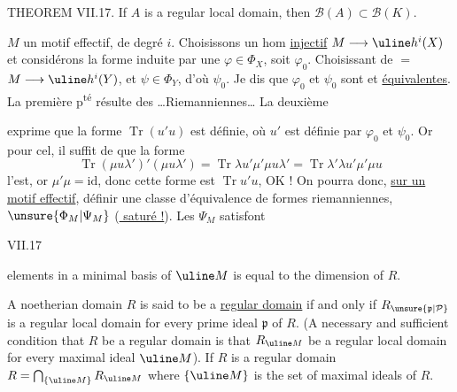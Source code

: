 THEOREM VII.17. If $A$ is a regular local domain, then
$\mathcal B(A)\subset\mathcal B(K)$.

 
$M$ un motif effectif,  de degré $i$.
Choisissons un hom \uline{injectif} $M\longrightarrow\uline h^i(X)$
et considérons la forme induite par une $\varphi\in\Phi_X$, soit $\varphi_0$.
Choisissant de $=$ $M\longrightarrow\uline h^i(Y)$, et $\psi\in\Phi_Y$,
d'où $\psi_0$. Je dis que $\varphi_0$ et $\psi_0$ sont
 et \uline{équivalentes}.
La première p\textsuperscript{té} résulte des
 
 \ldots Riemanniennes\ldots
La deuxième 


exprime que la forme $\operatorname{Tr}(u'u)$ est définie,
où $u'$ est définie par $\varphi_0$ et $\psi_0$. Or
 pour cel, il suffit de
  que la forme
\[
\operatorname{Tr}(\mu u\lambda')'(\mu u\lambda')
=\operatorname{Tr}\lambda u'\mu'\mu u\lambda'
=\operatorname{Tr}\lambda'\lambda u'\mu'\mu u
\]
l'est, or $\mu'\mu=\mathrm{id}$,
donc cette forme est $\operatorname{Tr}u'u$, OK !
On pourra donc, \uline{sur un motif effectif}, définir une classe
d'équivalence de formes riemanniennes, 
$\unsure{\Phi_M|\Psi_M}$ (\uline{ saturé !}). Les $\Psi_M$ satisfont

VII.17

elements in a minimal basis of $\uline M$ is equal to the dimension of $R$.

A noetherian domain $R$ is said to be a \uline{regular domain} if and
only if $R_{\unsure{\mathfrak p|\mathcal P}}$ is a regular local domain for every prime ideal $\mathfrak p$ of $R$.
(A necessary and sufficient condition that $R$ be a regular domain is
that $R_{\uline M}$ be a regular local domain for every maximal ideal $\uline M$). If
$R$ is a regular domain $R=\bigcap_{\{\uline M\}}R_{\uline M}$ where $\{\uline M\}$ is the set of
maximal ideals of $R$.

